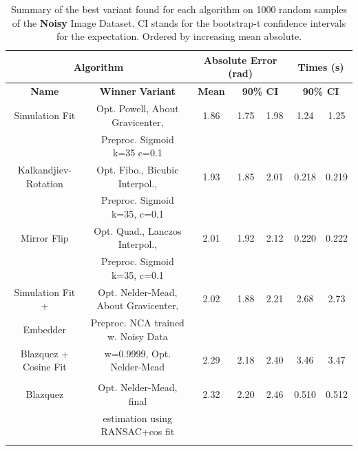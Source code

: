 \documentclass[11pt, a4paper, twoside]{article} %
\begin{document}
\begin{table}[h!]
\caption{Summary of the best variant found for each algorithm on 1000 random samples of the {\bf Noisy} Image Dataset. CI stands for the bootstrap-t confidence intervals for the expectation. Ordered by increasing mean absolute.}\label{tab:noisy}

\hspace{-0.6cm}\begin{tabular}{c|c|c|cc|cc}
\toprule
 \multicolumn{2}{c|}{\bf Algorithm} &  \multicolumn{3}{|c|}{\bf Absolute Error (rad)} & \multicolumn{2}{|c}{\bf Times (s)} \\ \midrule \midrule
{\bf                     Name} &                          {\bf Winner} {\bf Variant} &  {\bf Mean} &  \multicolumn{2}{c|}{\bf 90\% CI } &  \multicolumn{2}{|c}{\bf 90\% CI }\\
\bottomrule\rule{0pt}{4mm}{}
           Simulation Fit &         Opt. Powell, About Gravicenter, &  1.86 &       1.75 &      1.98 &         1.24 &        1.25 \\
                          &             Preproc. Sigmoid k=35 c=0.1 &       &            &           &              &             \\ \hline\rule{0pt}{4mm}{}Kalkandjiev-Rotation &         Opt. Fibo., Bicubic Interpol.,  &  1.93 &       1.85 &      2.01 &         0.218 &        0.219 \\
                          &            Preproc. Sigmoid k=35, c=0.1 &       &            &           &              &             \\ \hline
              \rule{0pt}{4mm}{}Mirror Flip &         Opt. Quad., Lanczos Interpol.,  &  2.01 &       1.92 &      2.12 &         0.220 &        0.222 \\
                          &            Preproc. Sigmoid k=35, c=0.1 &       &            &           &              &             \\ \hline
\rule{0pt}{4mm}{}Simulation Fit + &   Opt. Nelder-Mead, About Gravicenter,  &  2.02 &       1.88 &      2.21 &         2.68 &        2.73 \\
                         Embedder  &      Preproc. NCA trained w. Noisy Data &       &            &           &              &             \\ \hline
    \rule{0pt}{4mm}{}Blazquez + Cosine Fit &              w=0.9999, Opt. Nelder-Mead &  2.29 &       2.18 &      2.40 &         3.46 &        3.47 \\
                          &                                         &       &            &           &              &             \\ \hline
                 \rule{0pt}{4mm}{}Blazquez &                Opt. Nelder-Mead, final  &  2.32 &       2.20 &      2.46 &         0.510 &        0.512 \\ 
                          &         estimation using RANSAC+cos fit &       &            &           &              &             \\ \hline
           \rule{0pt}{4mm}{}                    
           

\end{tabular}
\end{table}
\end{document}
